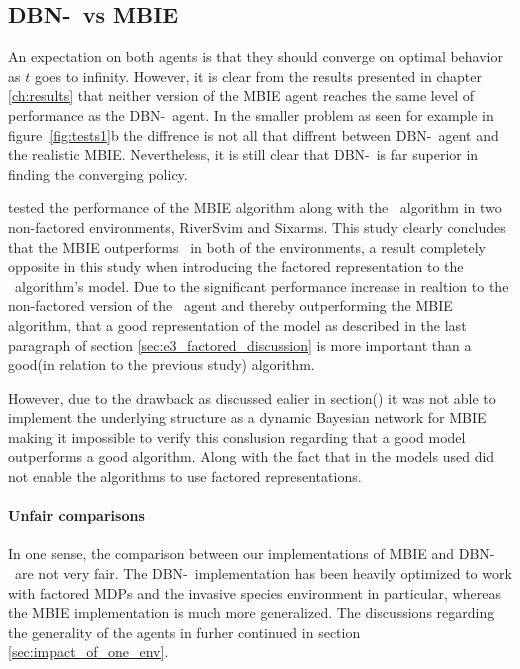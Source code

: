 \subsection{DBN-\etre\ vs MBIE }
An expectation on both agents is that they should converge on optimal behavior
as $t$ goes to infinity. However, it is clear from the results presented in
chapter \ref{ch:results} that neither version of the MBIE agent reaches the
same level of performance as the DBN-\etre\ agent. In the smaller problem as
seen for example in figure~\ref{fig:tests1}b the diffrence is not all that
diffrent between DBN-\etre\ agent and the realistic MBIE. Nevertheless, it is still clear that DBN-\etre\ is far superior in finding the converging policy.

\textcite{strehl2004empirical} tested the performance of the MBIE algorithm along with the \etre\ algorithm in two non-factored environments, RiverSvim and Sixarms. This study clearly concludes that the MBIE outperforms \etre\ in both of the environments, a result completely opposite in this study when introducing the factored representation to the \etre\ algorithm's model. Due to the significant performance increase in realtion to the non-factored version of the \etre\ agent and thereby outperforming the MBIE algorithm, that a good representation of the model as described in the last paragraph of section \ref{sec:e3_factored_discussion} is more important than a good(in relation to the previous study) algorithm.  

However, due to the drawback as discussed ealier in section() it was not able to implement the underlying structure as a dynamic Bayesian network for MBIE making it impossible to verify this conslusion regarding that a good model outperforms a good algorithm. Along with the fact that in \textcite{strehl2004empirical} the models used did not enable the algorithms to use factored representations.


\paragraph{Unfair comparisons}
In one sense, the comparison between our implementations of MBIE and DBN-\etre\
are not very fair. The DBN-\etre\ implementation has been heavily optimized to
work with factored MDPs and the invasive species environment in particular,
whereas the MBIE implementation is much more generalized. The discussions
regarding the generality of the agents in furher continued in section
\ref{sec:impact_of_one_env}. 

